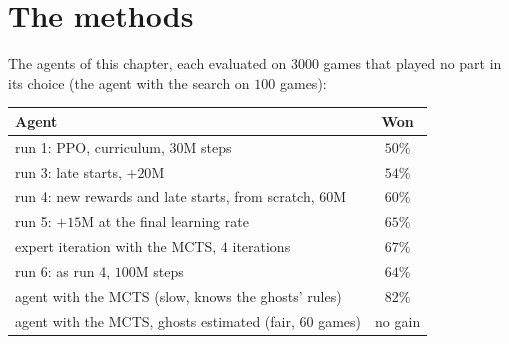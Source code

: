 \section{The methods}

The agents of this chapter, each evaluated on $3000$ games that played no
part in its choice (the agent with the search on $100$ games):
\begin{center}
  \begin{tabular}{@{}lc@{}}
    \toprule
    Agent & Won \\
    \midrule
    run 1: PPO, curriculum, $30$M steps & $50\%$ \\
    run 3: late starts, $+20$M & $54\%$ \\
    run 4: new rewards and late starts, from scratch, $60$M & $60\%$ \\
    run 5: $+15$M at the final learning rate & $65\%$ \\
    expert iteration with the MCTS, $4$ iterations & $67\%$ \\
    run 6: as run 4, $100$M steps & $64\%$ \\
    \midrule
    agent with the MCTS (slow, knows the ghosts' rules) & $82\%$ \\
    agent with the MCTS, ghosts estimated (fair, $60$ games) & no gain \\
    \bottomrule
  \end{tabular}
\end{center}

